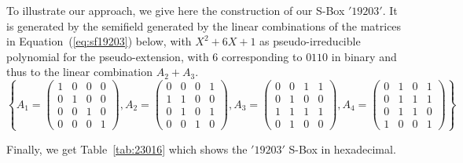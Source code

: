 \documentclass{article}\usepackage{amsthm}
\newcommand{\SBox}{S-Box\xspace}
\begin{document}
To illustrate our approach, we give here the construction of our \SBox
$'19203'$. It is generated by the semifield generated by the linear combinations
of the matrices in Equation~(\ref{eq:sf19203}) below, with $X^2 + 6X + 1$ as 
pseudo-irreducible polynomial for the pseudo-extension, with $6$
corresponding to $0110$ in binary and thus to the linear combination $A_2 + A_3$.
\begin{equation}\label{eq:sf19203}
\left \{ A_1 = 
\begin{pmatrix}
  1 & 0 & 0 & 0 \\
  0 & 1 & 0 & 0 \\
  0 & 0 & 1 & 0 \\
  0 & 0 & 0 & 1
\end{pmatrix} , 
A_2 =
\begin{pmatrix}
  0 & 0 & 0 & 1 \\
  1 & 1 & 0 & 0 \\
  0 & 1 & 0 & 1 \\
  0 & 0 & 1 & 0
\end{pmatrix} , 
A_3 =
\begin{pmatrix}
  0 & 0 & 1 & 1 \\
  0 & 1 & 0 & 0 \\
  1 & 1 & 1 & 1 \\
  0 & 1 & 0 & 0
\end{pmatrix}, 
A_4 =
\begin{pmatrix}
  0 & 1 & 0 & 1 \\
  0 & 1 & 1 & 1 \\
  0 & 1 & 1 & 0 \\
  1 & 0 & 0 & 1
\end{pmatrix} 
\right \} 
\end{equation}

Finally, we get Table~\ref{tab:23016} which shows the $'19203'$ \SBox in
hexadecimal.
\end{document}
